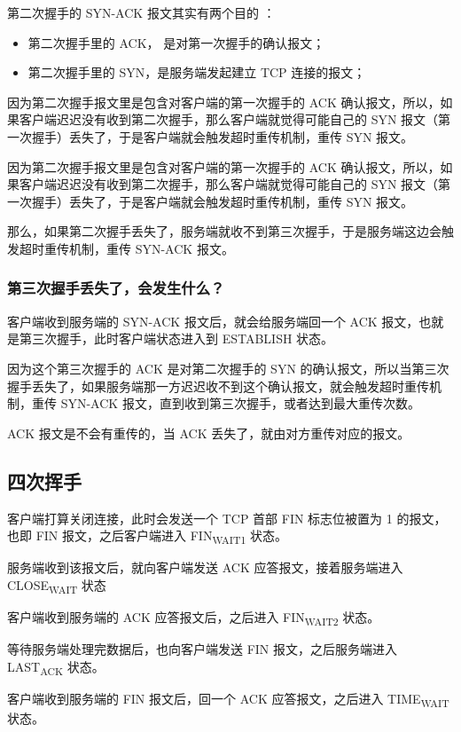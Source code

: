\documentclass[11pt]{article}
\begin{document}
第二次握手的 SYN-ACK 报文其实有两个目的 ：
\begin{itemize}
\item 第二次握手里的 ACK， 是对第一次握手的确认报文；
\item 第二次握手里的 SYN，是服务端发起建立 TCP 连接的报文；
\end{itemize}

因为第二次握手报文里是包含对客户端的第一次握手的 ACK 确认报文，所以，如果客户端迟迟没有收到第二次握手，那么客户端就觉得可能自己的 SYN 报文（第一次握手）丢失了，于是客户端就会触发超时重传机制，重传 SYN 报文。

因为第二次握手报文里是包含对客户端的第一次握手的 ACK 确认报文，所以，如果客户端迟迟没有收到第二次握手，那么客户端就觉得可能自己的 SYN 报文（第一次握手）丢失了，于是客户端就会触发超时重传机制，重传 SYN 报文。

那么，如果第二次握手丢失了，服务端就收不到第三次握手，于是服务端这边会触发超时重传机制，重传 SYN-ACK 报文。
\subsubsection{第三次握手丢失了，会发生什么？}
\label{sec:orgb1030f3}
客户端收到服务端的 SYN-ACK 报文后，就会给服务端回一个 ACK 报文，也就是第三次握手，此时客户端状态进入到 ESTABLISH 状态。

因为这个第三次握手的 ACK 是对第二次握手的 SYN 的确认报文，所以当第三次握手丢失了，如果服务端那一方迟迟收不到这个确认报文，就会触发超时重传机制，重传 SYN-ACK 报文，直到收到第三次握手，或者达到最大重传次数。

ACK 报文是不会有重传的，当 ACK 丢失了，就由对方重传对应的报文。
\subsection{四次挥手}
\label{sec:orgdc91ad1}
客户端打算关闭连接，此时会发送一个 TCP 首部 FIN 标志位被置为 1 的报文，也即 FIN 报文，之后客户端进入 FIN\textsubscript{WAIT}\textsubscript{1} 状态。

服务端收到该报文后，就向客户端发送 ACK 应答报文，接着服务端进入 CLOSE\textsubscript{WAIT} 状态

客户端收到服务端的 ACK 应答报文后，之后进入 FIN\textsubscript{WAIT}\textsubscript{2} 状态。

等待服务端处理完数据后，也向客户端发送 FIN 报文，之后服务端进入 LAST\textsubscript{ACK} 状态。

客户端收到服务端的 FIN 报文后，回一个 ACK 应答报文，之后进入 TIME\textsubscript{WAIT} 状态。
\end{document}
